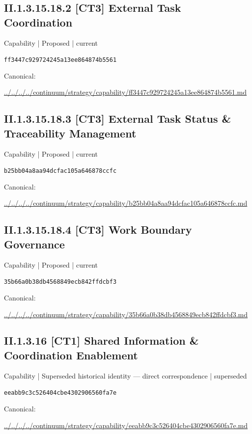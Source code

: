 \documentclass[10pt,a4paper]{article}
\begin{document}
\subsection*{II.1.3.15.18.2 [CT3] External Task Coordination}
{\small Capability | Proposed | current}\par
\texttt{ff3447c929724245a13ee864874b5561}\par
Canonical: \par
{\footnotesize\url{../../../../continuum/strategy/capability/ff3447c929724245a13ee864874b5561.md}}\par
\subsection*{II.1.3.15.18.3 [CT3] External Task Status \& Traceability Management}
{\small Capability | Proposed | current}\par
\texttt{b25bb04a8aa94dcfac105a646878ccfc}\par
Canonical: \par
{\footnotesize\url{../../../../continuum/strategy/capability/b25bb04a8aa94dcfac105a646878ccfc.md}}\par
\subsection*{II.1.3.15.18.4 [CT3] Work Boundary Governance}
{\small Capability | Proposed | current}\par
\texttt{35b66a0b38db4568849ecb842ffdcbf3}\par
Canonical: \par
{\footnotesize\url{../../../../continuum/strategy/capability/35b66a0b38db4568849ecb842ffdcbf3.md}}\par
\subsection*{II.1.3.16 [CT1] Shared Information \& Coordination Enablement}
{\small Capability | Superseded historical identity — direct correspondence | superseded}\par
\texttt{eeabb9c3c526404cbe4302906560fa7e}\par
Canonical: \par
{\footnotesize\url{../../../../continuum/strategy/capability/eeabb9c3c526404cbe4302906560fa7e.md}}\par
\end{document}

